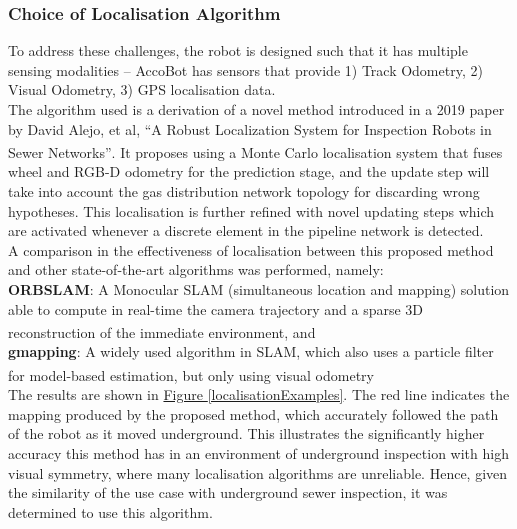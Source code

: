 \documentclass[11pt]{article}		%
\newcommand{\supercite}[1]{\textsuperscript{\cite{#1}}}		%
\newcommand{\figref}[1]{\hyperref[#1]{Figure \ref*{#1}}}    %
\begin{document}
		\subsubsection{Choice of Localisation Algorithm}

		To address these challenges, the robot is designed such that it has multiple sensing modalities – AccoBot has sensors that provide 1) Track Odometry, 2) Visual Odometry, 3) GPS localisation data.
		\\
        \hspace*{2ex}The algorithm used is a derivation of a novel method introduced in a 2019 paper by David Alejo, et al, “A Robust Localization System for Inspection Robots in Sewer Networks”\supercite{sewerpaper}. It proposes using a Monte Carlo localisation system that fuses wheel and RGB-D odometry for the prediction stage, and the update step will take into account the gas distribution network topology for discarding wrong hypotheses. This localisation is further refined with novel updating steps which are activated whenever a discrete element in the pipeline network is detected.
        \\
        \hspace*{2ex}A comparison in the effectiveness of localisation between this proposed method and other state-of-the-art algorithms was performed, namely:
       \\ \hspace*{2ex}\textbf{ORBSLAM}: A Monocular SLAM (simultaneous location and mapping) solution able to compute in real-time the camera trajectory and a sparse 3D reconstruction of the immediate environment\supercite{ORBSLAM}, and 
       \\ \hspace*{2ex}\textbf{gmapping}: A widely used algorithm in SLAM, which also uses a particle filter for model-based estimation, but only using visual odometry\supercite{gmapping}
        \\
       \hspace*{2ex} The results are shown in \figref{localisationExamples}. The red line indicates the mapping produced by the proposed method, which accurately followed the path of the robot as it moved underground. This illustrates the significantly higher accuracy this method has in an environment of underground inspection with high visual symmetry, where many localisation algorithms are unreliable. Hence, given the similarity of the use case with underground sewer inspection, it was determined to use this algorithm.
\end{document}

